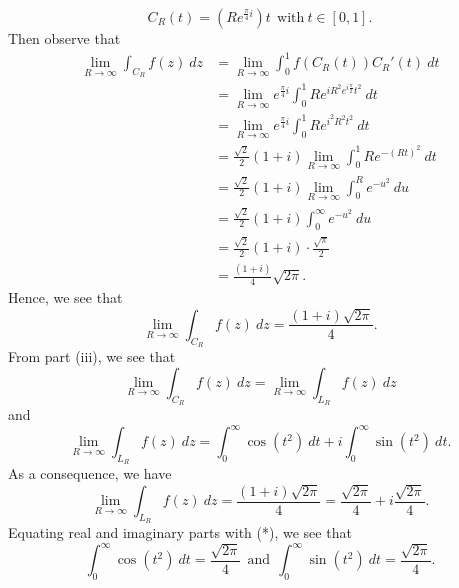 \documentclass[a4paper]{article}
\begin{document}
\begin{solution}
\begin{enumerate}
            \[  {C}_{R}(t) = (R e^{\frac{ \pi }{ 4 }  i} )t \ \ \text{with} \ t \in [0,1]. \]
            Then observe that 
            \begin{align*}
                \lim_{ R \to \infty  }  \int_{ {C}_{R} }^{  } f(z) \ dz &= \lim_{ R \to \infty  }  \int_{ 0 }^{ 1 }  f({C}_{R}(t)) {C}_{R}'(t) \ dt \\
                                                                        &= \lim_{ R \to \infty  } e^{\frac{ \pi }{ 4 } i} \int_{ 0 }^{ 1 } R e^{i R^{2} e^{i \frac{ \pi }{ 2 } } t^{2} } \ dt \\
                                                                        &= \lim_{ R \to \infty  } e^{\frac{ \pi }{ 4 } i}  \int_{ 0 }^{ 1 } R e^{i^{2} R^{2} t^{2}} \ dt \\
                                                                        &= \frac{ \sqrt{ 2 }  }{ 2 }  (1 + i) \lim_{ R \to \infty  }  \int_{ 0 }^{ 1 }  R e^{- (R t )^{2}} \ dt \\ 
                                                                        &= \frac{ \sqrt{ 2 }  }{ 2 } ( 1 + i) \lim_{ R \to \infty  }    \int_{ 0 }^{ R }  e^{- u^{2}} \ du  \tag{Let \( u = Rt \)}\\
                                                                        &= \frac{ \sqrt{ 2 }  }{ 2 } ( 1 + i ) \int_{ 0 }^{ \infty  } e^{- u^{2}} \ du \\
                                                                        &= \frac{ \sqrt{ 2 }  }{ 2 }  (1 + i) \cdot \frac{ \sqrt{ \pi  }  }{ 2 } \\
                                                                        &= \frac{ (1+i)   }{  4 } \sqrt{ 2 \pi }.  
            \end{align*}
            Hence, we see that
            \[  \lim_{ R \to \infty  } \int_{ {C}_{R} }^{  } f(z) \ dz = \frac{ (1+i) \sqrt{ 2 \pi }  }{ 4 }. \]
            From part (iii), we see that 
            \[  \lim_{ R \to \infty  }  \int_{ {C}_{R} }^{  } f(z) \ dz = \lim_{ R \to \infty  }  \int_{ {L}_{R} }^{  } f(z) \ dz \]
            and 
            \[  \lim_{ R \to \infty  }  \int_{ {L}_{R} }^{  } f(z) \ dz = \int_{ 0 }^{ \infty  } \cos(t^{2}) \ dt + i \int_{ 0 }^{ \infty  } \sin(t^{2}) \ dt. \tag{*}  \]
            As a consequence, we have 
            \[  \lim_{ R \to \infty  }  \int_{ {L}_{R} }^{  } f(z) \ dz = \frac{ (1+i) \sqrt{ 2 \pi  }  }{ 4  } = \frac{ \sqrt{ 2 \pi  }  }{ 4 } + i \frac{ \sqrt{ 2 \pi  }  }{ 4 }.   \]
            Equating real and imaginary parts with (*), we see that
            \[  \int_{ 0 }^{ \infty  }  \cos (t^{2}) \ dt = \frac{ \sqrt{ 2 \pi  }  }{ 4  } \ \ \text{and} \ \ \int_{ 0 }^{ \infty  }  \sin (t^{2}) \ dt = \frac{ \sqrt{ 2 \pi  }  }{ 4  }. \]

\end{enumerate}
\end{solution}
\end{document}
